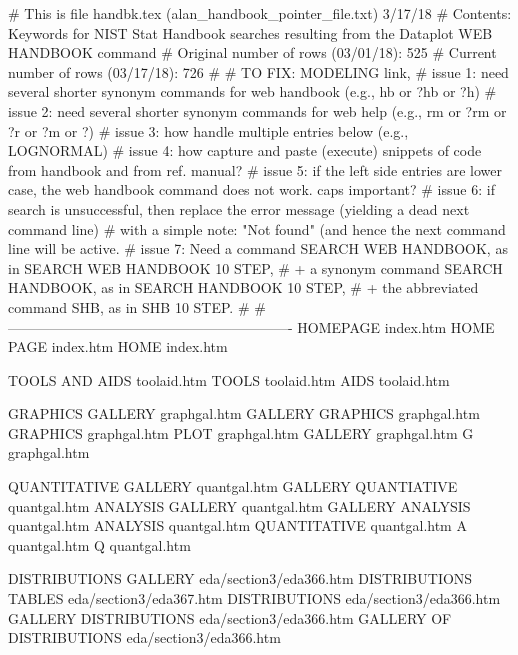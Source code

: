 # This is file handbk.tex   (alan_handbook_pointer_file.txt)   3/17/18
# Contents: Keywords for NIST Stat Handbook searches resulting from the Dataplot     WEB HANDBOOK     command
# Original number of rows (03/01/18): 525
# Current  number of rows (03/17/18): 726
#
# TO FIX: MODELING link,
# issue 1: need several shorter synonym commands for    web handbook (e.g., hb or ?hb or ?h)
# issue 2: need several shorter synonym commands for    web help     (e.g., rm or ?rm or ?r or ?m or ?)
# issue 3: how handle multiple entries below (e.g., LOGNORMAL)
# issue 4: how capture and paste (execute) snippets of code from handbook and from ref. manual?
# issue 5: if the left side entries are lower case, the web handbook command does not work.  caps important?
# issue 6: if search is unsuccessful, then replace the error message (yielding a dead next command line)
#          with a simple note: "Not found" (and hence the next command line will be active.
# issue 7: Need a command             SEARCH WEB HANDBOOK, as in SEARCH WEB HANDBOOK 10 STEP,
#          + a synonym command        SEARCH HANDBOOK,     as in SEARCH HANDBOOK 10 STEP,
#          + the abbreviated command  SHB,                 as in SHB 10 STEP.
#
# -------------------------------------------------------------
HOMEPAGE                                index.htm
HOME PAGE                               index.htm
HOME                                    index.htm

TOOLS AND AIDS                          toolaid.htm
TOOLS                                   toolaid.htm
AIDS                                    toolaid.htm

GRAPHICS GALLERY                        graphgal.htm
GALLERY GRAPHICS                        graphgal.htm
GRAPHICS                                graphgal.htm
PLOT                                    graphgal.htm
GALLERY                                 graphgal.htm
G                                       graphgal.htm

QUANTITATIVE GALLERY                    quantgal.htm
GALLERY QUANTIATIVE                     quantgal.htm
ANALYSIS GALLERY                        quantgal.htm
GALLERY ANALYSIS                        quantgal.htm
ANALYSIS                                quantgal.htm
QUANTITATIVE                            quantgal.htm
A                                       quantgal.htm
Q                                       quantgal.htm

DISTRIBUTIONS GALLERY                   eda/section3/eda366.htm
DISTRIBUTIONS TABLES                    eda/section3/eda367.htm
DISTRIBUTIONS                           eda/section3/eda366.htm
GALLERY DISTRIBUTIONS                   eda/section3/eda366.htm
GALLERY OF DISTRIBUTIONS                eda/section3/eda366.htm

